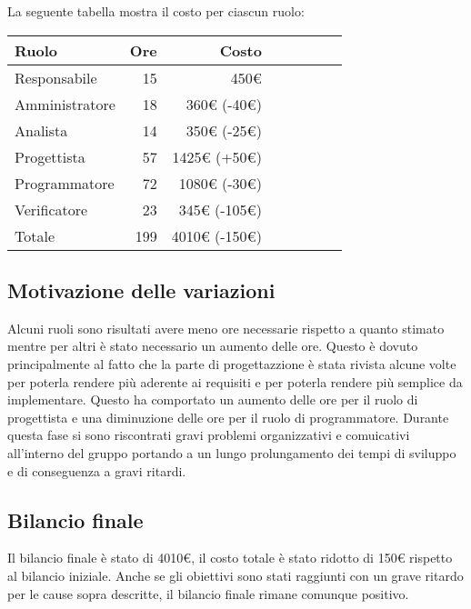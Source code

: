 La seguente tabella mostra il costo per ciascun ruolo:
\begin{table}[H]
    \begin{tabularx}{\linewidth}{X|rrrrrrr}
    \rowcolor{gray!30}Ruolo & Ore & Costo \\
    \hline
    Responsabile                            & 15    & 450€ \\
    \rowcolor{gray!10}Amministratore        & 18    & 360€ (-40€)\\
    Analista                                & 14    & 350€ (-25€)\\
    \rowcolor{gray!10}Progettista           & 57    & 1425€ (+50€) \\
    Programmatore                           & 72    & 1080€ (-30€) \\
    \rowcolor{gray!10}Verificatore          & 23    & 345€ (-105€)\\
    \hline Totale                           & 199   & 4010€ (-150€) \\ 
    \end{tabularx}
\end{table}

\subsection{Motivazione delle variazioni}

Alcuni ruoli sono risultati avere meno ore necessarie rispetto a quanto stimato mentre per altri è stato necessario un aumento delle ore. Questo è dovuto principalmente al fatto che la parte di progettazzione è stata rivista alcune volte per poterla rendere più aderente ai requisiti e per poterla rendere più semplice da implementare. Questo ha comportato un aumento delle ore per il ruolo di progettista e una diminuzione delle ore per il ruolo di programmatore. Durante questa fase si sono riscontrati gravi problemi organizzativi e comuicativi all'interno del gruppo portando a un lungo prolungamento dei tempi di sviluppo e di conseguenza a gravi ritardi.

\subsection{Bilancio finale}

Il bilancio finale è stato di 4010€, il costo totale è stato ridotto di 150€ rispetto al bilancio iniziale. Anche se gli obiettivi sono stati raggiunti con un grave ritardo per le cause sopra descritte, il bilancio finale rimane comunque positivo.